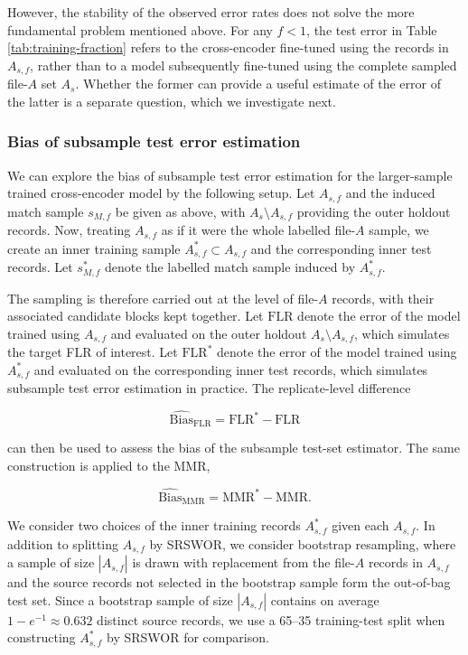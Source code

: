 However, the stability of the observed error rates does not solve the more fundamental
problem mentioned above. For any $f<1$, the test error in Table \ref{tab:training-fraction}
refers to the cross-encoder fine-tuned using the records in $A_{s,f}$, rather
than to a model subsequently fine-tuned using the complete sampled file-$A$
set $A_s$. Whether
the former can provide a useful estimate of the error of the latter is a separate question,
which we investigate next.


\subsubsection{Bias of subsample test error estimation}
\label{sec:subsample-bias}

We can explore the bias of subsample test error estimation for the larger-sample trained
cross-encoder model by the following setup. Let $A_{s,f}$ and the induced match sample
$s_{M,f}$ be given as above, with $A_s\setminus A_{s,f}$ providing the outer holdout
records. Now, treating $A_{s,f}$ as if it were the whole labelled file-$A$ sample, we create
an inner training sample $A^*_{s,f}\subset A_{s,f}$ and the corresponding inner test records.
Let $s^*_{M,f}$ denote the labelled match sample induced by $A^*_{s,f}$.

The sampling is therefore carried out at the level of file-$A$ records, with their associated
candidate blocks kept together. Let $\mathrm{FLR}$ denote the error of the model trained
using $A_{s,f}$ and evaluated on the outer holdout $A_s\setminus A_{s,f}$, which simulates
the target FLR of interest. Let $\mathrm{FLR}^*$ denote the error of the model trained using
$A^*_{s,f}$ and evaluated on the corresponding inner test records, which simulates
subsample test error estimation in practice. The replicate-level difference

\begin{equation}
\widehat{\mathrm{Bias}}_{\mathrm{FLR}}
=
\mathrm{FLR}^*-\mathrm{FLR}
\end{equation}

can then be used to assess the bias of the subsample test-set estimator. The same
construction is applied to the MMR,

\begin{equation}
\widehat{\mathrm{Bias}}_{\mathrm{MMR}}
=
\mathrm{MMR}^*-\mathrm{MMR}.
\end{equation}

We consider two choices of the inner training records $A^*_{s,f}$ given each
$A_{s,f}$. In addition to splitting $A_{s,f}$ by SRSWOR, we consider bootstrap
resampling, where a sample of size $|A_{s,f}|$ is drawn with replacement from the
file-$A$ records in $A_{s,f}$ and the source records not selected in the bootstrap sample
form the out-of-bag test set. Since a bootstrap sample of size $|A_{s,f}|$ contains on
average $1-e^{-1}\approx0.632$ distinct source records, we use a 65--35 training-test
split when constructing $A^*_{s,f}$ by SRSWOR for comparison.

